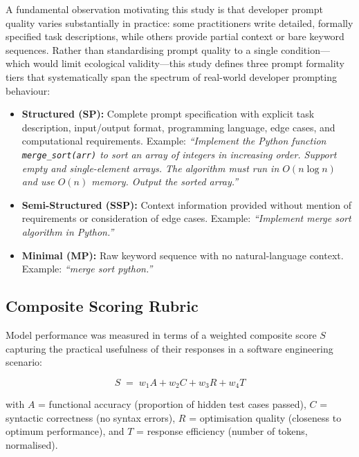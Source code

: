\documentclass[conference]{IEEEtran}
\begin{document}
A fundamental observation motivating this study is that developer prompt quality 
varies substantially in practice: some practitioners write detailed, formally 
specified task descriptions, while others provide partial context or bare keyword 
sequences. Rather than standardising prompt quality to a single condition—which 
would limit ecological validity—this study defines three prompt formality tiers 
that systematically span the spectrum of real-world developer prompting behaviour:

\begin{itemize}
  \item \textbf{Structured (SP):} Complete prompt specification with explicit task description, input/output format, programming language, edge cases, and computational requirements. Example: \textit{``Implement the Python function \texttt{merge\_sort(arr)} to sort an array of integers in increasing order. Support empty and single-element arrays. The algorithm must run in $O(n \log n)$ and use $O(n)$ memory. Output the sorted array.''}

  \item \textbf{Semi-Structured (SSP):} Context information provided without mention of requirements or consideration of edge cases. Example: \textit{``Implement merge sort algorithm in Python.''}

  \item \textbf{Minimal (MP):} Raw keyword sequence with no natural-language context. Example: \textit{``merge sort python.''}
\end{itemize}

\subsection{Composite Scoring Rubric}

Model performance was measured in terms of a weighted composite score $S$ capturing the practical usefulness of their responses in a software engineering scenario:

\begin{equation}
  S \;=\; w_1 A + w_2 C + w_3 R + w_4 T
  \label{eq:score}
\end{equation}

\noindent with $A$ = functional accuracy (proportion of hidden test cases passed), $C$ = syntactic correctness (no syntax errors), $R$ = optimisation quality (closeness to optimum performance), and $T$ = response efficiency (number of tokens, normalised).
\end{document}
